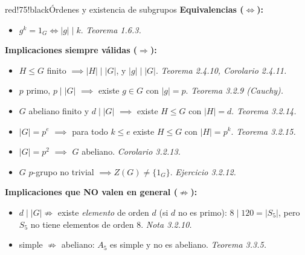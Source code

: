 \documentclass[11pt,twoside]{article}
\begin{document}
\begin{equivbox}{red!75!black}{Órdenes y existencia de subgrupos}
\textbf{Equivalencias ($\Leftrightarrow$):}
\begin{itemize}[leftmargin=1.8em]
\item $g^{k} = 1_{G} \iff \lvert g \rvert \mid k$. \hfill\textit{Teorema 1.6.3.}
\end{itemize}
\textbf{Implicaciones siempre válidas ($\Rightarrow$):}
\begin{itemize}[leftmargin=1.8em]
\item $H \leq G$ finito $\implies \lvert H \rvert \mid \lvert G \rvert$, y $\lvert g \rvert \mid \lvert G \rvert$. \hfill\textit{Teorema 2.4.10, Corolario 2.4.11.}
\item $p$ primo, $p \mid \lvert G \rvert$ $\implies$ existe $g \in G$ con $\lvert g \rvert = p$. \hfill\textit{Teorema 3.2.9 (Cauchy).}
\item $G$ abeliano finito y $d \mid \lvert G \rvert$ $\implies$ existe $H \leq G$ con $\lvert H \rvert = d$. \hfill\textit{Teorema 3.2.14.}
\item $\lvert G \rvert = p^{e}$ $\implies$ para todo $k \leq e$ existe $H \leq G$ con $\lvert H \rvert = p^{k}$. \hfill\textit{Teorema 3.2.15.}
\item $\lvert G \rvert = p^{2}$ $\implies$ $G$ abeliano. \hfill\textit{Corolario 3.2.13.}
\item $G$ $p$-grupo no trivial $\implies Z(G) \neq \{ 1_{G} \}$. \hfill\textit{Ejercicio 3.2.12.}
\end{itemize}
\textbf{Implicaciones que NO valen en general ($\not\Rightarrow$):}
\begin{itemize}[leftmargin=1.8em]
\item $d \mid \lvert G \rvert \not\Rightarrow$ existe \emph{elemento} de orden $d$ (si $d$ no es primo): $8 \mid 120 = \lvert S_{5} \rvert$, pero $S_{5}$ no tiene elementos de orden $8$. \hfill\textit{Nota 3.2.10.}
\item simple $\not\Rightarrow$ abeliano: $A_{5}$ es simple y no es abeliano. \hfill\textit{Teorema 3.3.5.}
\end{itemize}
\end{equivbox}
\end{document}
